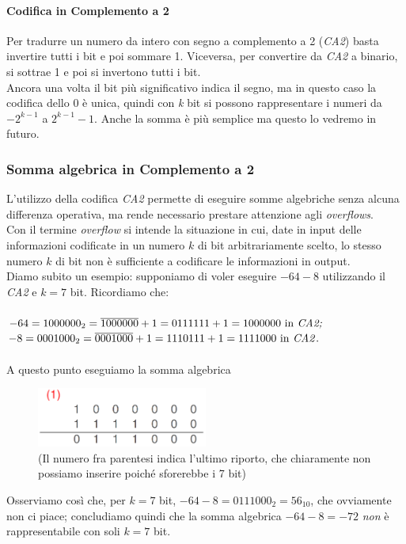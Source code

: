 \documentclass[class=book, crop=false]{standalone}
\begin{document}
\paragraph*{Codifica in Complemento a 2} Per tradurre un numero da intero con segno a complemento a 2 (\emph{CA2}) basta invertire tutti i bit e poi sommare 1. Viceversa, per convertire da \emph{CA2} a binario, si sottrae 1 e poi si invertono tutti i bit. \\
Ancora una volta il bit più significativo indica il segno, ma in questo caso la codifica dello 0 è unica, quindi con \emph{k} bit si possono rappresentare i numeri da $-2^{k-1}$ a $2^{k-1}-1$. Anche la somma è più semplice ma questo lo vedremo in futuro.
\subsubsection{Somma algebrica in Complemento a 2} L'utilizzo della codifica \emph{CA2} permette di eseguire somme algebriche senza alcuna differenza operativa, ma rende necessario prestare attenzione agli \emph{overflows}.\\
Con il termine \emph{overflow} si intende la situazione in cui, date in input delle informazioni codificate in un numero $k$ di bit arbitrariamente scelto, lo stesso numero $k$ di bit non è sufficiente a codificare le informazioni in output. \\
Diamo subito un esempio: supponiamo di voler eseguire $-64-8$ utilizzando il \emph{CA2} e $k=7$ bit. Ricordiamo che:\\\\
$-64=1000000_{2}=\overline{1000000}+1=0111111+1=1000000 \text{ in \emph{CA2;}}$\\
$-8=0001000_{2}=\overline{0001000}+1=1110111+1=1111000 \text{ in \emph{CA2}}.$\\\\
A questo punto eseguiamo la somma algebrica
\begin{figure}[H]
	\centering
	\includegraphics[width=0.5\textwidth,keepaspectratio]{overflow.png}
	\caption{(Il numero fra parentesi indica l'ultimo riporto, che chiaramente non possiamo inserire poiché sforerebbe i 7 bit)}
\end{figure}
Osserviamo così che, per $k=7$ bit, $-64-8=0111000_{2}=56_{10}$, che ovviamente non ci piace; concludiamo quindi che la somma algebrica $-64-8=-72$ \emph{non} è rappresentabile con soli $k=7$ bit.\\
\end{document}
